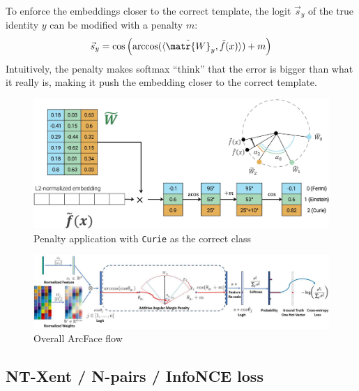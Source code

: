 \begin{description}
        To enforce the embeddings closer to the correct template, the logit $\vec{s}_y$ of the true identity $y$ can be modified with a penalty $m$:
        \[ \vec{s}_y = \cos\left( \arccos(\langle \tilde{\matr{W}}_y, \tilde{f}(x) \rangle) + m \right) \]
        Intuitively, the penalty makes softmax ``think'' that the error is bigger than what it really is, making it push the embedding closer to the correct template.

        \begin{figure}[H]
            \centering
            \includegraphics[width=0.65\linewidth]{./img/_arcface_penalty.jpg}
            \caption{Penalty application with \texttt{Curie} as the correct class}
        \end{figure}

        \begin{figure}[H]
            \centering
            \includegraphics[width=0.95\linewidth]{./img/_arcface_flow.jpg}
            \caption{Overall ArcFace flow}
        \end{figure}
\end{description}


\subsection{NT-Xent / N-pairs / InfoNCE loss}

